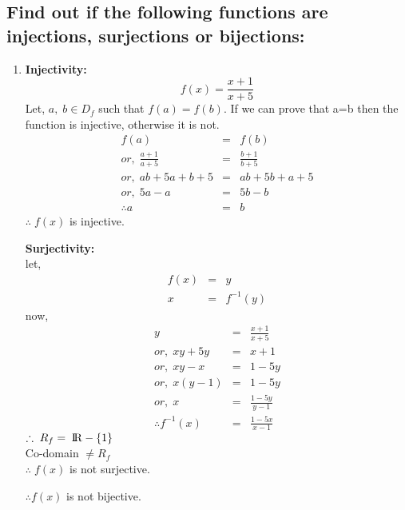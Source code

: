\documentclass{article}
\begin{document}
\subsection{Find out if the following functions are injections, surjections or bijections:}
\begin{enumerate}
\item{
\begin{minipage}[t]{0.4\linewidth}
\textbf{Injectivity:}
    $$f(x) = \frac{x+1}{x+5}$$
    Let, $a,\;b\in D_f$ such that $f(a) = f(b)$. If we can prove that a=b then the function is injective, otherwise it is not.
\begin{eqnarray*}
    f(a) &=& f(b)\\
    or,\;\frac{a+1}{a+5} &=& \frac{b+1}{b+5}\\
    or,\; ab+5a+b+5 &=& ab+5b+a+5\\
    or,\; 5a-a &=& 5b-b\\
    \therefore a&=& b
\end{eqnarray*}
$\therefore\;f(x)$  is injective.
\end{minipage}\hfill
\begin{minipage}[t]{0.4\linewidth}
\textbf{Surjectivity:}
\\let,
\begin{eqnarray*}
    f(x) &=& y\\
    x &=& f^{-1}(y)
\end{eqnarray*}
now,
\begin{eqnarray*}
    y &=& \frac{x+1}{x+5}\\
    or,\; xy +5y &=& x+1\\
    or,\; xy-x &=& 1-5y\\
    or,\; x(y-1)&=& 1-5y\\
    or,\; x &=& \frac{1-5y}{y-1}\\
    \therefore f^{-1}(x) &=& \frac{1-5x}{x-1}
\end{eqnarray*}
$\therefore \; R_f  = \;\rm I\!R-\{1\}$ \\
Co-domain $\ne R_f$\\
$\therefore\; f(x)$ is not surjective.
\end{minipage}

\begin{center}
{$\therefore f(x)$ is not bijective.}
\end{center}
\vspace{1cm}
}


\end{enumerate}
\end{document}
